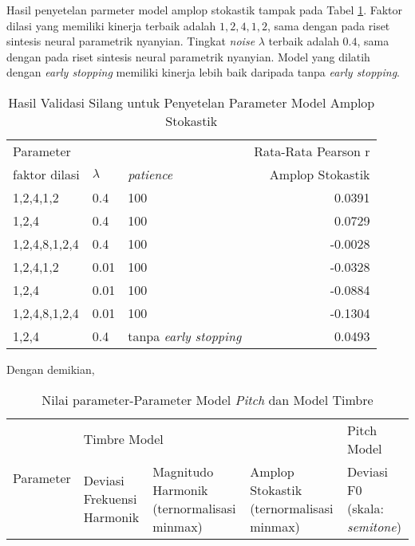 Hasil penyetelan parmeter model amplop stokastik tampak pada Tabel \ref{tab-stoc-model-tuning-results}. Faktor dilasi yang memiliki kinerja terbaik adalah $1,2,4,1,2$, sama dengan pada riset sintesis neural parametrik nyanyian. Tingkat \textit{noise} $\lambda$ terbaik adalah $0.4$, sama dengan pada riset sintesis neural parametrik nyanyian. Model yang dilatih dengan \textit{early stopping} memiliki kinerja lebih baik daripada tanpa \textit{early stopping}.

\begin{table}[h]
    \centering
    \caption{Hasil Validasi Silang untuk Penyetelan Parameter Model Amplop Stokastik}\label{tab-stoc-model-tuning-results}
    \begin{tabular}{ |l|l|l|r| } 
     \hline
     \multicolumn{3}{|l|}{Parameter} & Rata-Rata Pearson r\\
     \cline{1-3}
     faktor dilasi & $\lambda$ & \textit{patience} & Amplop Stokastik\\
	 \hline 
	1,2,4,1,2& 0.4& 100           & 0.0391\\\hline
	1,2,4& 0.4& 100               & 0.0729\\\hline
	1,2,4,8,1,2,4& 0.4& 100       &-0.0028\\\hline
	1,2,4,1,2& 0.01& 100          &-0.0328\\\hline
	1,2,4& 0.01& 100              &-0.0884\\\hline
	1,2,4,8,1,2,4& 0.01& 100      &-0.1304\\\hline
	1,2,4& 0.4& tanpa \textit{early stopping}       & 0.0493\\\hline
    \end{tabular}
\end{table}

Dengan demikian, 

\begin{table}[h]
	\centering
	\caption{Nilai parameter-Parameter Model \textit{Pitch} dan Model Timbre}
	\begin{tabularx}{\textwidth}{|X|X|X|X|X|}
	\hline
	\multirow{2}{*}{Parameter}&\multicolumn{3}{|X|}{Timbre Model}&{Pitch Model}\\\cline{2-5}
	&Deviasi Frekuensi Harmonik&Magnitudo Harmonik (ternormalisasi minmax)&Amplop Stokastik (ternormalisasi minmax)&Deviasi F0 (skala: \textit{semitone})\\
	\hline
	\end{tabularx}

\end{table}

